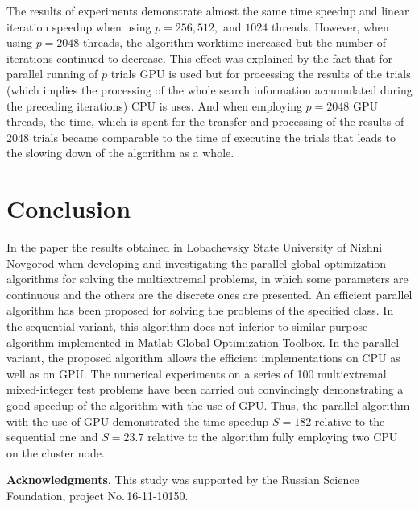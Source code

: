 \documentclass[runningheads]{llncs}
\begin{document}
The results of experiments demonstrate almost the same time speedup and linear iteration
speedup when using $p=256, 512,$ and $1024$ threads. However, when using $p=2048$
threads, the algorithm worktime increased but the number of iterations continued to decrease.
This effect was explained by the fact that for parallel running of $p$ trials GPU is used but for
processing the results of the trials (which implies the processing of the whole search information
accumulated during the preceding iterations) CPU is uses. And when employing $p=2048$
GPU threads, the time, which is spent for the transfer and processing of the results of 2048
trials became comparable to the time of executing the trials that leads to the slowing down of
the algorithm as a whole.


\section{Conclusion}
In the paper the results obtained in Lobachevsky State University of Nizhni Novgorod
when developing and investigating the parallel global optimization algorithms for solving the
multiextremal problems, in which some parameters are continuous and the others are the discrete
ones are presented.
An efficient parallel algorithm has been proposed for solving the problems of the specified class.
In the sequential variant, this algorithm does not inferior to similar purpose algorithm
implemented in Matlab Global Optimization Toolbox.
In the parallel variant, the proposed algorithm allows the efficient implementations on CPU as
well as on GPU.
The numerical experiments on a series of 100 multiextremal mixed-integer test problems have been carried out
convincingly demonstrating a good speedup of the algorithm with the use of GPU.
Thus, the parallel algorithm with the use of GPU demonstrated the time speedup $S = 182$
relative to the sequential one and $S = 23.7$ relative to the algorithm fully employing two CPU on
the cluster node.

\medskip

\textbf{Acknowledgments}. This study was supported by the Russian Science Foundation, project No.\,16-11-10150.
\end{document}
